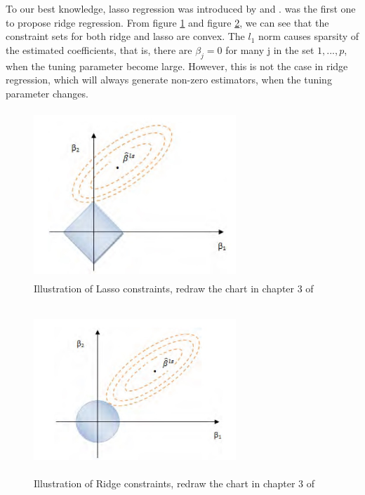 To our best knowledge, lasso regression was introduced by \cite{tibshirani1996regression} and \cite{chen2001atomic}. \cite{hoerl1970ridge} was the first one to propose ridge regression. From figure \ref{fig:lasso} and figure \ref{fig:ridge}, we can see that the constraint sets for both ridge and lasso are convex. The $l_1$ norm causes sparsity of the estimated coefficients, that is, there are $\beta_j=0$ for many j in the set ${1,...,p}$, when the tuning parameter become large.  However, this is not the case in ridge regression, which will always generate non-zero estimators, when the tuning parameter changes.  
 
 
 \begin{figure}[hbtp]
 	\begin{center}
 		\includegraphics[width=3in,height=2.5in]{figures/lasso.jpg}
 	\end{center}
 	\caption{Illustration of Lasso constraints, redraw the chart in chapter 3 of \cite{friedman2001elements}} \label{fig:lasso}
 \end{figure}
 
 \begin{figure}[hbtp]
 	\begin{center}
 		\includegraphics[width=3in,height=2.5in]{figures/ridge.jpg}
 	\end{center}
 	\caption{Illustration of Ridge constraints, redraw the chart in chapter 3 of \cite{friedman2001elements}} \label{fig:ridge}
 \end{figure}

